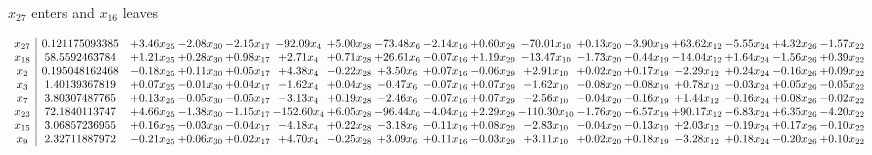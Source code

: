 \documentclass[9pt]{article}
\begin{document}
 $ x_{27} $ enters and $ x_{16} $ leaves 

 \[\begin{array}{c| c c@{\hskip 2pt} c@{\hskip 2pt} c@{\hskip 2pt} c@{\hskip 2pt} c@{\hskip 2pt} c@{\hskip 2pt} c@{\hskip 2pt} c@{\hskip 2pt} c@{\hskip 2pt} c@{\hskip 2pt} c@{\hskip 2pt} c@{\hskip 2pt} c@{\hskip 2pt} c@{\hskip 2pt} c@{\hskip 2pt} }
 x_{27}   &  0.121175093385 & +  3.46 x_{25} & -2.08 x_{30} & -2.15 x_{17} & -92.09 x_{4} & +  5.00 x_{28} & -73.48 x_{6} & -2.14 x_{16} & +  0.60 x_{29} & -70.01 x_{10} & +  0.13 x_{20} & -3.90 x_{19} & + 63.62 x_{12} & -5.55 x_{24} & +  4.32 x_{26} & -1.57 x_{22}\\
 x_{18}   &  58.5592463784 & +  1.21 x_{25} & +  0.28 x_{30} & +  0.98 x_{17} & +  2.71 x_{4} & +  0.71 x_{28} & + 26.61 x_{6} & -0.07 x_{16} & +  1.19 x_{29} & -13.47 x_{10} & -1.73 x_{20} & -0.44 x_{19} & -14.04 x_{12} & +  1.64 x_{24} & -1.56 x_{26} & +  0.39 x_{22}\\
 x_{2}   &  0.195048162468 & -0.18 x_{25} & +  0.11 x_{30} & +  0.05 x_{17} & +  4.38 x_{4} & -0.22 x_{28} & +  3.50 x_{6} & +  0.07 x_{16} & -0.06 x_{29} & +  2.91 x_{10} & +  0.02 x_{20} & +  0.17 x_{19} & -2.29 x_{12} & +  0.24 x_{24} & -0.16 x_{26} & +  0.09 x_{22}\\
 x_{3}   &  1.40139367819 & +  0.07 x_{25} & -0.01 x_{30} & +  0.04 x_{17} & -1.62 x_{4} & +  0.04 x_{28} & -0.47 x_{6} & -0.07 x_{16} & +  0.07 x_{29} & -1.62 x_{10} & -0.08 x_{20} & -0.08 x_{19} & +  0.78 x_{12} & -0.03 x_{24} & +  0.05 x_{26} & -0.05 x_{22}\\
 x_{7}   &  3.80307487765 & +  0.13 x_{25} & -0.05 x_{30} & -0.05 x_{17} & -3.13 x_{4} & +  0.19 x_{28} & -2.46 x_{6} & -0.07 x_{16} & +  0.07 x_{29} & -2.56 x_{10} & -0.04 x_{20} & -0.16 x_{19} & +  1.44 x_{12} & -0.16 x_{24} & +  0.08 x_{26} & -0.02 x_{22}\\
 x_{23}   &  72.1840113747 & +  4.66 x_{25} & -1.38 x_{30} & -1.15 x_{17} & -152.60 x_{4} & +  6.05 x_{28} & -96.44 x_{6} & -4.04 x_{16} & +  2.29 x_{29} & -110.30 x_{10} & -1.76 x_{20} & -6.57 x_{19} & + 90.17 x_{12} & -6.83 x_{24} & +  6.35 x_{26} & -4.20 x_{22}\\
 x_{15}   &  3.06857236955 & +  0.16 x_{25} & -0.03 x_{30} & -0.04 x_{17} & -4.18 x_{4} & +  0.22 x_{28} & -3.18 x_{6} & -0.11 x_{16} & +  0.08 x_{29} & -2.83 x_{10} & -0.04 x_{20} & -0.13 x_{19} & +  2.03 x_{12} & -0.19 x_{24} & +  0.17 x_{26} & -0.10 x_{22}\\
 x_{9}   &  2.32711887972 & -0.21 x_{25} & +  0.06 x_{30} & +  0.02 x_{17} & +  4.70 x_{4} & -0.25 x_{28} & +  3.09 x_{6} & +  0.11 x_{16} & -0.03 x_{29} & +  3.11 x_{10} & +  0.02 x_{20} & +  0.18 x_{19} & -3.28 x_{12} & +  0.18 x_{24} & -0.20 x_{26} & +  0.10 x_{22}\\

\end{array}\]
\end{document}
